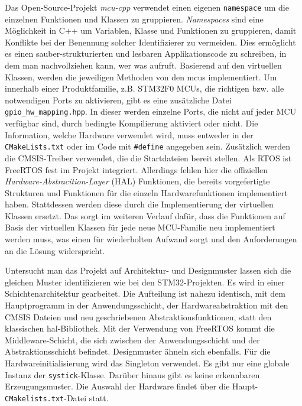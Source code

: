 Das Open-Source-Projekt \emph{mcu-cpp} verwendet einen eigenen \texttt{namespace} um die einzelnen Funktionen und Klassen zu gruppieren.
\emph{Namespaces} sind eine Möglichkeit in C++ um Variablen, Klasse und Funktionen zu gruppieren, damit Konflikte bei der Benennung solcher Identifizierer zu vermeiden.
Dies ermöglicht es einen sauber-strukturierten und lesbaren Applikationscode zu schreiben, in dem man nachvollziehen kann, wer was aufruft.
Basierend auf den virtuellen Klassen, werden die jeweiligen Methoden von den \gls{mcu}s implementiert.
Um innerhalb einer Produktfamilie, z.B. STM32F0 MCUs, die richtigen bzw. alle notwendigen Ports zu aktivieren, gibt es eine zusätzliche Datei \texttt{gpio\_hw\_mapping.hpp}.
In dieser werden einzelne Ports, die nicht auf jeder MCU verfügbar sind, durch bedingte Kompilierung aktiviert oder nicht.
Die Information, welche Hardware verwendet wird, muss entweder in der \texttt{CMakeLists.txt} oder im Code mit \texttt{\#define} angegeben sein.
Zusätzlich werden die CMSIS-Treiber verwendet, die die Startdateien bereit stellen.
Als RTOS ist FreeRTOS fest im Projekt integriert.
Allerdings fehlen hier die offiziellen \emph{Hardware-Abstracition-Layer} (HAL) Funktionen, die bereits vorgefertigte Strukturen und Funktionen für die einzeln Hardwarefunktionen implementiert haben.
Stattdessen werden diese durch die Implementierung der virtuellen Klassen ersetzt.
Das sorgt im weiteren Verlauf dafür, dass die Funktionen auf Basis der virtuellen Klassen für jede neue MCU-Familie neu implementiert werden muss, was einen für wiederholten Aufwand sorgt und den Anforderungen an die Lösung widerspricht.

Untersucht man das Projekt auf Architektur- und Designmuster lassen sich die gleichen Muster identifizieren wie bei den STM32-Projekten.
Es wird in einer Schichtenarchitektur gearbeitet.
Die Aufteilung ist nahezu identisch, mit dem Hauptprogramm in der Anwendungsschicht, der Hardwareabstraktion mit den CMSIS Dateien und neu geschriebenen Abstraktionsfunktionen, statt den klassischen \gls{hal}-Bibliothek.
Mit der Verwendung von FreeRTOS kommt die Middleware-Schicht, die sich zwischen der Anwendungsschicht und der Abstraktionsschicht befindet.
Designmuster ähneln sich ebenfalls.
Für die Hardwareinitialisierung wird das Singleton verwendet.
Es gibt nur eine globale Instanz der \texttt{systick}-Klasse.
Darüber hinaus gibt es keine erkennbaren Erzeugungsmuster.
Die Auswahl der Hardware findet über die Haupt-\texttt{CMakelists.txt}-Datei statt.

